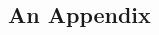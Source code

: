 \documentclass[a4paper, 11pt, oneside]{article/HSR}  %
\begin{document}
\begin{multicols}{2}
  \appendix %




  \section{An Appendix}
  \Blindtext


\end{multicols}


\label{Bibliography}
\end{document}
